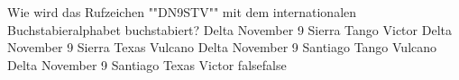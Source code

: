     {Wie wird das Rufzeichen ""DN9STV"" mit dem internationalen Buchstabieralphabet  buchstabiert?}
    {Delta November 9 Sierra Tango Victor}
    {Delta November 9 Sierra Texas Vulcano}
    {Delta November 9 Santiago Tango Vulcano}
    {Delta November 9 Santiago Texas Victor}
    {false}{false}